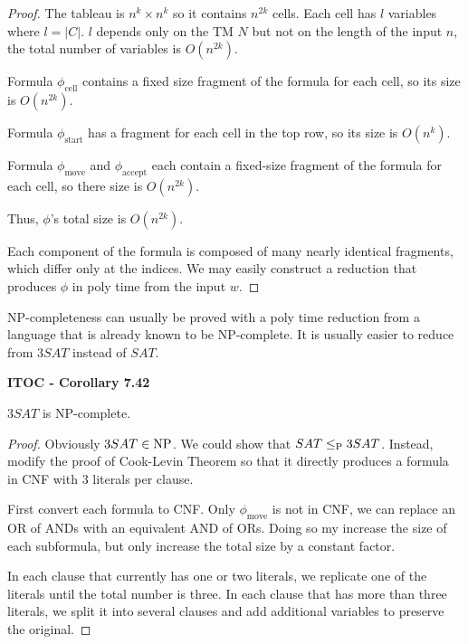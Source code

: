 \begin{mdframed}
\begin{proof}
The tableau is $n^k \times n^k$ so it contains $n^{2k}$ cells. Each cell has $l$ variables where $l = |C|$. $l$ depends only on the TM $N$ but not on the length of the input $n$, the total number of variables is $O(n^{2k})$.

Formula $\phi_\text{cell}$ contains a fixed size fragment of the formula for each cell, so its size is $O(n^{2k})$.

Formula $\phi_\text{start}$ has a fragment for each cell in the top row, so its size is $O(n^k)$.

Formula $\phi_\text{move}$ and $\phi_\text{accept}$ each contain a fixed-size fragment of the formula for each cell, so there size is $O(n^{2k})$. 

Thus, $\phi$'s total size is $O(n^{2k})$.

Each component of the formula is composed of many nearly identical fragments, which differ only at the indices. We may easily construct a reduction that produces $\phi$ in poly time from the input $w$.
\end{proof}
\end{mdframed}

{\color{blue} NP-completeness can usually be proved with a poly time reduction from a language that is already known to be NP-complete. It is usually easier to reduce from $3SAT$ instead of $SAT$.}

\label{lang:3SAT_NPC}
\begin{shaded}
\textbf{ITOC - Corollary 7.42}

\medskip
$3SAT$ is NP-complete.
\end{shaded}

\begin{mdframed}
\begin{proof}
Obviously $3SAT \in \NP$. We could show that $SAT \leq_\P 3SAT$. Instead, modify the proof of Cook-Levin Theorem so that it directly produces a formula in CNF with 3 literals per clause.

First convert each formula to CNF. Only $\phi_\text{move}$ is not in CNF, we can replace an OR of ANDs with an equivalent AND of ORs. Doing so my increase the size of each subformula, but only increase the total size by a constant factor.

In each clause that currently has one or two literals, we replicate one of the literals until the total number is three. In each clause that has more than three literals, we split it into several clauses and add additional variables to preserve the original.
\end{proof}
\end{mdframed}

